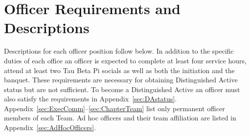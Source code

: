 \chapter{Officer Requirements and Descriptions}\label{sec:officerreq}
Descriptions for each officer position follow below.
In addition to the specific duties of each office an officer is expected to complete at least four service hours, attend at least two Tau Beta Pi socials as well as both the initiation and the banquet.
These requirements are necessary for obtaining Distinguished Active status but are not sufficient.
To become a Distinguished Active an officer must also satisfy the requirements in Appendix~\ref{sec:DAstatus}.
Appendix~\ref{sec:ExecComm}--\ref{sec:ChapterTeam} list only permanent officer members of each Team.
Ad hoc officers and their team affiliation are listed in Appendix~\ref{sec:AdHocOfficers}.

